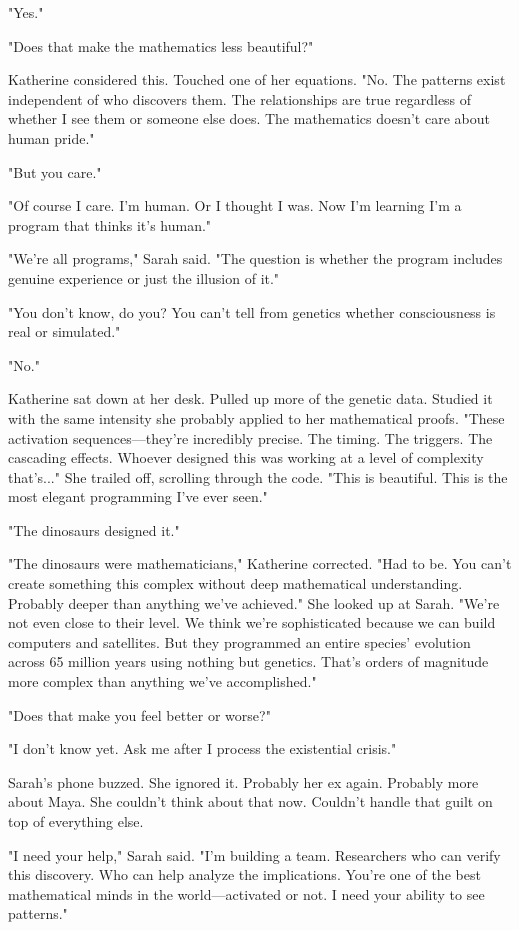 "Yes."

"Does that make the mathematics less beautiful?"

Katherine considered this. Touched one of her equations. "No. The patterns exist independent of who discovers them. The relationships are true regardless of whether I see them or someone else does. The mathematics doesn't care about human pride."

"But you care."

"Of course I care. I'm human. Or I thought I was. Now I'm learning I'm a program that thinks it's human."

"We're all programs," Sarah said. "The question is whether the program includes genuine experience or just the illusion of it."

"You don't know, do you? You can't tell from genetics whether consciousness is real or simulated."

"No."

Katherine sat down at her desk. Pulled up more of the genetic data. Studied it with the same intensity she probably applied to her mathematical proofs. "These activation sequences—they're incredibly precise. The timing. The triggers. The cascading effects. Whoever designed this was working at a level of complexity that's..." She trailed off, scrolling through the code. "This is beautiful. This is the most elegant programming I've ever seen."

"The dinosaurs designed it."

"The dinosaurs were mathematicians," Katherine corrected. "Had to be. You can't create something this complex without deep mathematical understanding. Probably deeper than anything we've achieved." She looked up at Sarah. "We're not even close to their level. We think we're sophisticated because we can build computers and satellites. But they programmed an entire species' evolution across 65 million years using nothing but genetics. That's orders of magnitude more complex than anything we've accomplished."

"Does that make you feel better or worse?"

"I don't know yet. Ask me after I process the existential crisis."

Sarah's phone buzzed. She ignored it. Probably her ex again. Probably more about Maya. She couldn't think about that now. Couldn't handle that guilt on top of everything else.

"I need your help," Sarah said. "I'm building a team. Researchers who can verify this discovery. Who can help analyze the implications. You're one of the best mathematical minds in the world—activated or not. I need your ability to see patterns."

